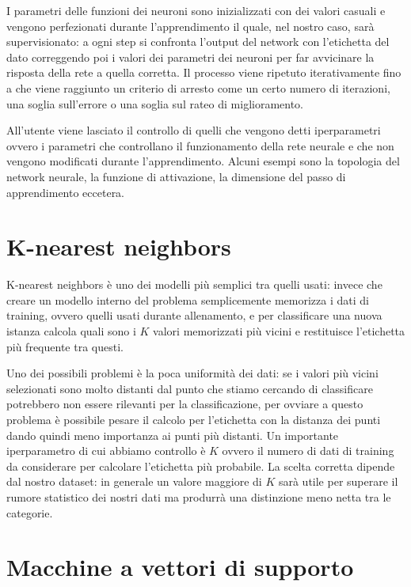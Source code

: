 \documentclass[a4paper,12pt]{report}
\begin{document}
I parametri delle funzioni dei neuroni sono inizializzati con dei valori casuali
e vengono perfezionati durante l'apprendimento il quale, nel nostro caso, sarà
supervisionato: a ogni step si confronta l'output del network con l'etichetta
del dato correggendo poi i valori dei parametri dei neuroni per far avvicinare
la risposta della rete a quella corretta. Il processo viene ripetuto
iterativamente fino a che viene raggiunto un criterio di arresto come un certo
numero di iterazioni, una soglia sull'errore o una soglia sul rateo di
miglioramento. 

All'utente viene lasciato il controllo di quelli che vengono detti iperparametri
ovvero i parametri che controllano il funzionamento della rete neurale e che non
vengono modificati durante l'apprendimento. Alcuni esempi sono la topologia del
network neurale, la funzione di attivazione, la dimensione del passo di
apprendimento eccetera.


\section{K-nearest neighbors}

K-nearest neighbors è uno dei modelli più semplici tra quelli usati: invece che
creare un modello interno del problema semplicemente memorizza i dati di
training, ovvero quelli usati durante allenamento, e per classificare una nuova
istanza calcola quali sono i $K$ valori memorizzati più vicini e restituisce
l'etichetta più frequente tra questi.

Uno dei possibili problemi è la poca uniformità dei dati: se i valori più vicini
selezionati sono molto distanti dal punto che stiamo cercando di classificare
potrebbero non essere rilevanti per la classificazione, per ovviare a questo
problema è possibile pesare il calcolo per l'etichetta con la distanza dei punti
dando quindi meno importanza ai punti più distanti. Un importante iperparametro
di cui abbiamo controllo è $K$ ovvero il numero di dati di training da
considerare per calcolare l'etichetta più probabile. La scelta corretta dipende
dal nostro dataset: in generale un valore maggiore di $K$ sarà utile per
superare il rumore statistico dei nostri dati ma produrrà una distinzione meno
netta tra le categorie.

\newpage %


\section{Macchine a vettori di supporto}
\end{document}
